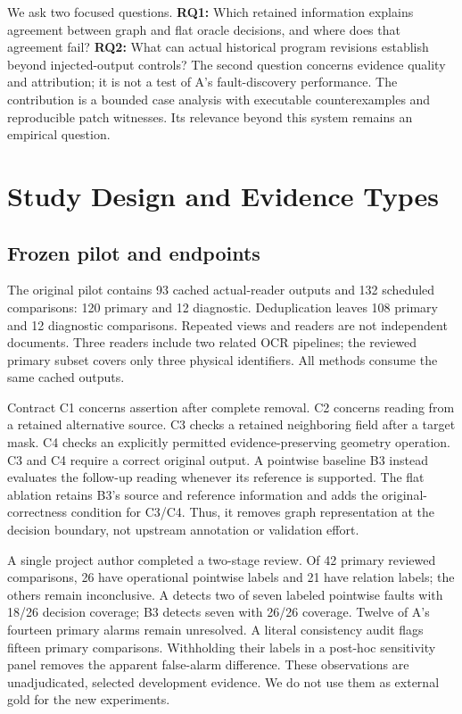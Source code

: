 \documentclass[sigconf,review,anonymous]{acmart}
\begin{document}
We ask two focused questions. \textbf{RQ1:} Which retained information explains agreement between graph and flat oracle decisions, and where does that agreement fail? \textbf{RQ2:} What can actual historical program revisions establish beyond injected-output controls? The second question concerns evidence quality and attribution; it is not a test of A's fault-discovery performance. The contribution is a bounded case analysis with executable counterexamples and reproducible patch witnesses. Its relevance beyond this system remains an empirical question.

\section{Study Design and Evidence Types}
\subsection{Frozen pilot and endpoints}
The original pilot contains 93 cached actual-reader outputs and 132 scheduled comparisons: 120 primary and 12 diagnostic. Deduplication leaves 108 primary and 12 diagnostic comparisons. Repeated views and readers are not independent documents. Three readers include two related OCR pipelines; the reviewed primary subset covers only three physical identifiers. All methods consume the same cached outputs.

Contract C1 concerns assertion after complete removal. C2 concerns reading from a retained alternative source. C3 checks a retained neighboring field after a target mask. C4 checks an explicitly permitted evidence-preserving geometry operation. C3 and C4 require a correct original output. A pointwise baseline B3 instead evaluates the follow-up reading whenever its reference is supported. The flat ablation retains B3's source and reference information and adds the original-correctness condition for C3/C4. Thus, it removes graph representation at the decision boundary, not upstream annotation or validation effort.

A single project author completed a two-stage review. Of 42 primary reviewed comparisons, 26 have operational pointwise labels and 21 have relation labels; the others remain inconclusive. A detects two of seven labeled pointwise faults with 18/26 decision coverage; B3 detects seven with 26/26 coverage. Twelve of A's fourteen primary alarms remain unresolved. A literal consistency audit flags fifteen primary comparisons. Withholding their labels in a post-hoc sensitivity panel removes the apparent false-alarm difference. These observations are unadjudicated, selected development evidence. We do not use them as external gold for the new experiments.
\end{document}
